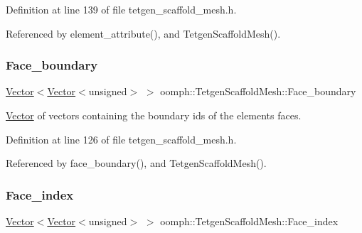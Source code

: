Definition at line 139 of file tetgen\+\_\+scaffold\+\_\+mesh.\+h.



Referenced by element\+\_\+attribute(), and Tetgen\+Scaffold\+Mesh().

\mbox{\label{classoomph_1_1TetgenScaffoldMesh_aefb3cd9a27c4c507ae2e7ca2da8217bd}} 
\subsubsection{\texorpdfstring{Face\+\_\+boundary}{Face\_boundary}}
{\footnotesize\ttfamily \hyperlink{classoomph_1_1Vector}{Vector}$<$\hyperlink{classoomph_1_1Vector}{Vector}$<$unsigned$>$ $>$ oomph\+::\+Tetgen\+Scaffold\+Mesh\+::\+Face\+\_\+boundary\hspace{0.3cm}{\ttfamily [protected]}}



\hyperlink{classoomph_1_1Vector}{Vector} of vectors containing the boundary ids of the elements\textquotesingle{} faces. 



Definition at line 126 of file tetgen\+\_\+scaffold\+\_\+mesh.\+h.



Referenced by face\+\_\+boundary(), and Tetgen\+Scaffold\+Mesh().

\mbox{\label{classoomph_1_1TetgenScaffoldMesh_a92a09461106996546e69d14ec5168278}} 
\subsubsection{\texorpdfstring{Face\+\_\+index}{Face\_index}}
{\footnotesize\ttfamily \hyperlink{classoomph_1_1Vector}{Vector}$<$\hyperlink{classoomph_1_1Vector}{Vector}$<$unsigned$>$ $>$ oomph\+::\+Tetgen\+Scaffold\+Mesh\+::\+Face\+\_\+index\hspace{0.3cm}{\ttfamily [protected]}}




